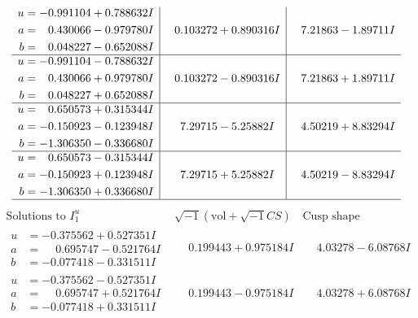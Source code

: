 \documentclass[1p]{elsarticle_modified}
\theoremstyle{definition}
\newcommand{\I}{\sqrt{-1}}
\begin{document}
$$\begin{array}{c|c|c}
\begin{aligned}
u &= -0.991104 + 0.788632 I \\
a &= \phantom{-}0.430066 - 0.979780 I \\
b &= \phantom{-}0.048227 - 0.652088 I\end{aligned}
 & \phantom{-}0.103272 + 0.890316 I & \phantom{-}7.21863 - 1.89711 I \\ \hline\begin{aligned}
u &= -0.991104 - 0.788632 I \\
a &= \phantom{-}0.430066 + 0.979780 I \\
b &= \phantom{-}0.048227 + 0.652088 I\end{aligned}
 & \phantom{-}0.103272 - 0.890316 I & \phantom{-}7.21863 + 1.89711 I \\ \hline\begin{aligned}
u &= \phantom{-}0.650573 + 0.315344 I \\
a &= -0.150923 - 0.123948 I \\
b &= -1.306350 - 0.336680 I\end{aligned}
 & \phantom{-}7.29715 - 5.25882 I & \phantom{-}4.50219 + 8.83294 I \\ \hline\begin{aligned}
u &= \phantom{-}0.650573 - 0.315344 I \\
a &= -0.150923 + 0.123948 I \\
b &= -1.306350 + 0.336680 I\end{aligned}
 & \phantom{-}7.29715 + 5.25882 I & \phantom{-}4.50219 - 8.83294 I\\
 \hline 
 \end{array}$$\newpage$$\begin{array}{c|c|c}  
\text{Solutions to }I^u_{1}& \I (\text{vol} + \sqrt{-1}CS) & \text{Cusp shape}\\
 \hline 
\begin{aligned}
u &= -0.375562 + 0.527351 I \\
a &= \phantom{-}0.695747 - 0.521764 I \\
b &= -0.077418 - 0.331511 I\end{aligned}
 & \phantom{-}0.199443 + 0.975184 I & \phantom{-}4.03278 - 6.08768 I \\ \hline\begin{aligned}
u &= -0.375562 - 0.527351 I \\
a &= \phantom{-}0.695747 + 0.521764 I \\
b &= -0.077418 + 0.331511 I\end{aligned}
 & \phantom{-}0.199443 - 0.975184 I & \phantom{-}4.03278 + 6.08768 I \\ \hline\begin{aligned}

\end{aligned}
\end{array}$$
\end{document}
